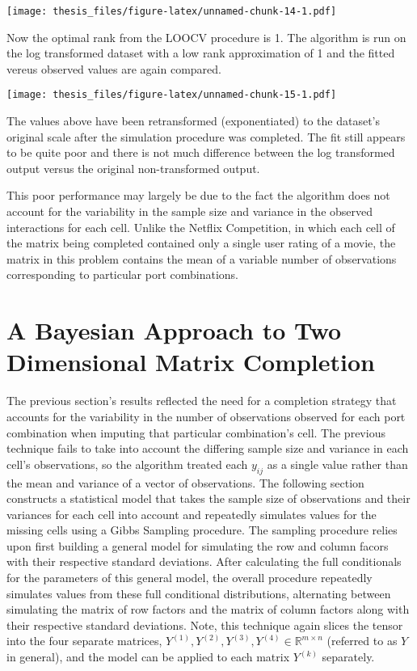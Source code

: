 \documentclass[12pt,twoside]{dukestatscithesis}
\theoremstyle{definition}
\theoremstyle{definition}
\theoremstyle{definition}
\theoremstyle{remark}
\begin{document}
\texttt{[image: thesis\_files/figure-latex/unnamed-chunk-14-1.pdf]}

Now the optimal rank from the LOOCV procedure is 1. The algorithm is run
on the log transformed dataset with a low rank approximation of 1 and
the fitted vereus observed values are again compared.

\texttt{[image: thesis\_files/figure-latex/unnamed-chunk-15-1.pdf]}

The values above have been retransformed (exponentiated) to the
dataset's original scale after the simulation procedure was completed.
The fit still appears to be quite poor and there is not much difference
between the log transformed output versus the original non-transformed
output.

This poor performance may largely be due to the fact the algorithm does
not account for the variability in the sample size and variance in the
observed interactions for each cell. Unlike the Netflix Competition, in
which each cell of the matrix being completed contained only a single
user rating of a movie, the matrix in this problem contains the mean of
a variable number of observations corresponding to particular port
combinations.

\chapter{A Bayesian Approach to Two Dimensional Matrix
Completion}\label{a-bayesian-approach-to-two-dimensional-matrix-completion}

The previous section's results reflected the need for a completion
strategy that accounts for the variability in the number of observations
observed for each port combination when imputing that particular
combination's cell. The previous technique fails to take into account
the differing sample size and variance in each cell's observations, so
the algorithm treated each \(y_{ij}\) as a single value rather than the
mean and variance of a vector of observations. The following section
constructs a statistical model that takes the sample size of
observations and their variances for each cell into account and
repeatedly simulates values for the missing cells using a Gibbs Sampling
procedure. The sampling procedure relies upon first building a general
model for simulating the row and column facors with their respective
standard deviations. After calculating the full conditionals for the
parameters of this general model, the overall procedure repeatedly
simulates values from these full conditional distributions, alternating
between simulating the matrix of row factors and the matrix of column
factors along with their respective standard deviations. Note, this
technique again slices the tensor into the four separate matrices,
\(Y^{(1)}, Y^{(2)}, Y^{(3)}, Y^{(4)} \in \mathbb{R}^{m \times n}\)
(referred to as \(Y\) in general), and the model can be applied to each
matrix \(Y^{(k)}\) separately.
\end{document}
